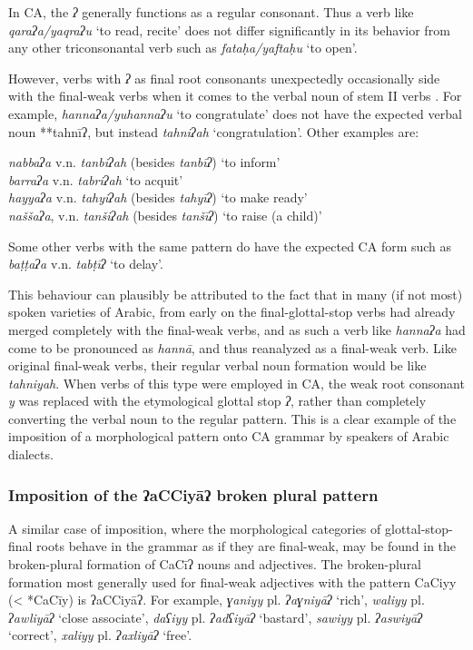 \documentclass[output=paper]{langsci/langscibook}
\begin{document}
In CA, the \textit{ʔ} generally functions as a regular consonant. Thus a verb like \textit{qaraʔa/yaqraʔu} ‘to read, recite’ does not differ significantly in its behavior from any other triconsonantal verb such as \textit{fataḥa/yaftaḥu} ‘to open’. 

However, verbs with \textit{ʔ} as final root consonants unexpectedly occasionally side with the final-weak verbs when it comes to the verbal noun of stem II verbs \citep[128]{Fischer2002}. For example, \textit{hannaʔa/yuhannaʔu} ‘to congratulate’ does not have the expected verbal noun **tahnīʔ, but instead \textit{tahniʔah} ‘congratulation’. Other examples are:

\ea
\ea\textit{nabbaʔa} v.n. \textit{tanbiʔah} (besides \textit{tanbīʔ}) ‘to inform’\\
\ex\textit{barraʔa} v.n. \textit{tabriʔah} ‘to acquit’\\
\ex\textit{hayyaʔa} v.n. \textit{tahyiʔah} (besides \textit{tahyīʔ}) ‘to make ready’\\
\ex\textit{naššaʔa}, v.n. \textit{tanšiʔah} (besides \textit{tanšīʔ}) ‘to raise (a child)’
\z
\z

Some other verbs with the same pattern do have the expected CA form such as \textit{baṭṭaʔa} v.n. \textit{tabṭīʔ} ‘to delay’.

This behaviour can plausibly be attributed to the fact that in many (if not most) spoken varieties of Arabic, from early on the final-glottal-stop verbs had already merged completely with the final-weak verbs, and as such a verb like \textit{hannaʔa} had come to be pronounced as \textit{hannā}, and thus reanalyzed as a final-weak verb. Like original final-weak verbs, their regular verbal noun formation would be like \textit{tahniyah}. When verbs of this type were employed in CA, the weak root consonant \textit{y} was replaced with the etymological glottal stop \textit{ʔ}, rather than completely converting the verbal noun to the regular pattern. This is a clear example of the imposition of a morphological pattern onto CA grammar by speakers of Arabic dialects.

\subsubsection{\label{bkm:Ref13224796}Imposition of the ʔaCCiyāʔ broken plural pattern}

A similar case of imposition, where the morphological categories of glottal-stop-final roots behave in the grammar as if they are final-weak, may be found in the broken-plural formation of CaCīʔ nouns and adjectives. The broken-plural formation most generally used for final-weak adjectives with the pattern CaCiyy (< *CaCīy) is ʔaCCiyāʔ. For example, \textit{ɣaniyy} pl. \textit{ʔaɣniyāʔ} ‘rich’, \textit{waliyy} pl. \textit{ʔawliyāʔ} ‘close associate’, \textit{daʕiyy} pl. \textit{ʔadʕiyāʔ} ‘bastard’, \textit{sawiyy} pl. \textit{ʔaswiyāʔ} ‘correct’, \textit{xaliyy} pl. \textit{ʔaxliyāʔ} ‘free’.
\end{document}
